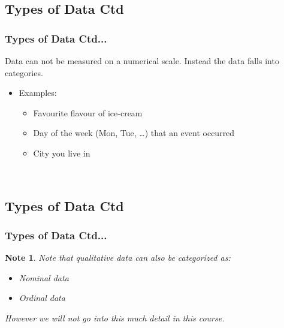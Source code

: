 \documentclass[xcolor=svgnames, compress]{beamer}
\newtheorem{nt}{Note}
\begin{document}
\subsection*{Types of Data Ctd}

\begin{frame}
\frametitle{Types of Data Ctd...} 

\vspace{-0.5cm}

\begin{definition}
Data can not be measured on a numerical scale. 
Instead the data falls into categories.
\end{definition}

\begin{itemize}
\item	Examples:
	\begin{itemize}\justifying
	\item	Favourite flavour of ice-cream
	\item	Day of the week (Mon, Tue, \ldots) that an event occurred
	\item	City you live in
	\end{itemize}
\end{itemize}

\hfill\\


\end{frame}




\subsection*{Types of Data Ctd}

\begin{frame}
\frametitle{Types of Data Ctd...} 

\vspace{-1.00cm}

\begin{nt}
Note that qualitative data can also be categorized as:
\begin{itemize}\justifying
\item	Nominal data
\item	Ordinal data
\end{itemize}
However we will not go into this much detail in this course.
\end{nt}

\hfill\\

\end{frame}
\end{document}
